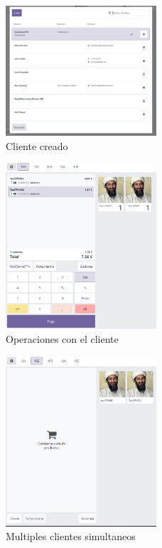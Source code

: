 \documentclass[a4paper,12pt]{article}
\begin{document}
\begin{figure}[h!]
    \centering
    \includegraphics[width=0.5\textwidth]{pr2odoo55-clienteCreado.png}
    \caption{Cliente creado}
\end{figure}
\FloatBarrier

\begin{figure}[h!]
    \centering
    \includegraphics[width=0.5\textwidth]{pr2odoo56-operacionesCliente101.png}
    \caption{Operaciones con el cliente}
\end{figure}
\FloatBarrier

\begin{figure}[h!]
    \centering
    \includegraphics[width=0.5\textwidth]{pr2odoo57-diferentesClientesSimultaneos.png}
    \caption{Multiples clientes simultaneos}
\end{figure}
\FloatBarrier
\end{document}
